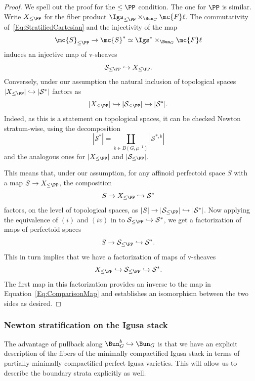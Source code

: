 \documentclass[letterpaper,11pt]{amsart}
\begin{document}
\begin{proof} 
We spell out the proof for the $\leq \PP$ condition. The one for $\PP$ is similar. Write $X_{\leq\PP}$ for the fiber product $\Igs_{\leq\PP}\times_{\Bun_G}\mc{F}\ell$. The commutativity of~\eqref{Eq:StratifiedCartesian} and the injectivity of the map
\[\mc{S}_{\leq \PP}\to \mc{S}^\ast\simeq \Igs^\ast\times_{\Bun_G}\mc{F}\ell\] 
induces an injective map of v-sheaves 
\begin{equation}\label{Eq:ComparisonMap}
\mathcal{S}_{\leq\PP}\hookrightarrow X_{\leq\PP}.
\end{equation}
Conversely, under our assumption the natural inclusion of topological spaces $|X_{\leq\PP}|\hookrightarrow |\mathcal{S}^\ast|$ factors as 
\[
|X_{\leq\PP}|\hookrightarrow |\mathcal{S}_{\leq\PP}|\hookrightarrow |\mathcal{S}^\ast|.
\]
Indeed, as this is a statement on topological spaces, it can be checked Newton stratum-wise, using the decomposition 
 \[
 |\mathcal{S}^\ast|= \coprod_{b\in B(G,\mu^{-1})} |\mathcal{S}^{\ast,b}|
 \]
and the analogous ones for $|X_{\leq\PP}|$ and $|\mathcal{S}_{\leq\PP}|$. 

This means that, under our assumption, for any affinoid perfectoid space $S$ with a map $S\to X_{\leq\PP}$, the composition 
\[
S\to X_{\leq\PP} \hookrightarrow \mathcal{S}^\ast
\]
factors, on the level of topological spaces, as $|S|\to |\mathcal{S}_{\leq\PP}|\hookrightarrow |\mathcal{S}^\ast|$. Now applying the equivalence of $(i)$ and $(iv)$ in \cite[Proposition 5.3]{Ecod} to $\mathcal{S}_{\leq\PP} \hookrightarrow \mathcal{S}^\ast$, we get a factorization of maps of perfectoid spaces
\[S\to \mathcal{S}_{\leq\PP} \hookrightarrow \mathcal{S}^\ast.\]
This in turn implies that we have a factorization of maps of v-sheaves
\[X_{\leq\PP} \hookrightarrow \mathcal{S}_{\leq\PP}\hookrightarrow \mathcal{S}^\ast.\]
The first map in this factorization provides an inverse to the map in Equation~\eqref{Eq:ComparisonMap} and establishes an isomorphism between the two sides as desired.
\end{proof}

\subsubsection{Newton stratification on the Igusa stack}
The advantage of pullback along $\Bun_G^b\hookrightarrow\Bun_G$ is that we have an explicit description of the fibers of the minimally compactified Igusa stack in terms of partially minimally compactified perfect Igusa varieties. This will allow us to describe the boundary strata explicitly as well. 
\end{document}
